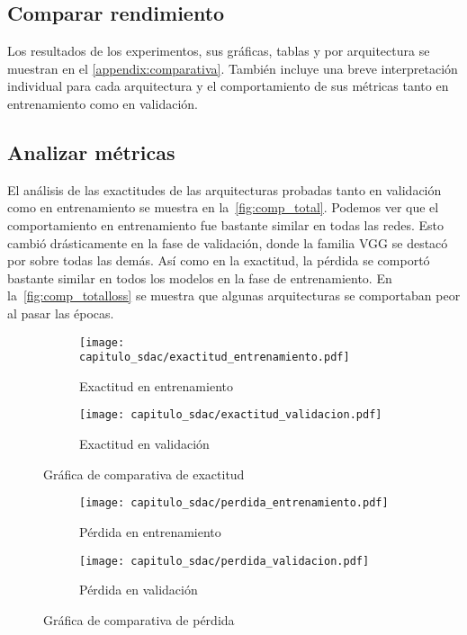 \subsection{Comparar rendimiento}

Los resultados de los experimentos, sus gráficas, tablas y por arquitectura se
muestran en el \autoref{appendix:comparativa}. También incluye una breve
interpretación individual para cada arquitectura y el comportamiento de sus
métricas tanto en entrenamiento como en validación.

\subsection{Analizar métricas}

El análisis de las exactitudes de las arquitecturas probadas tanto en validación
como en entrenamiento se muestra en la~\autoref{fig:comp_total}. Podemos ver que
el comportamiento en entrenamiento fue bastante similar en todas las redes. Esto
cambió drásticamente en la fase de validación, donde la familia VGG se destacó
por sobre todas las demás. Así como en la exactitud, la pérdida se comportó
bastante similar en todos los modelos en la fase de entrenamiento. En
la~\autoref{fig:comp_totalloss} se muestra que algunas arquitecturas se
comportaban peor al pasar las épocas.

\begin{figure}[H]
    \centering
    \begin{subfigure}[b]{0.8\textwidth}
        \centering
       \texttt{[image: capitulo\_sdac/exactitud\_entrenamiento.pdf]}
       \caption{Exactitud en entrenamiento}\label{fig:comp_ent} 
    \end{subfigure}

    \begin{subfigure}[b]{0.8\textwidth}
        \centering
       \texttt{[image: capitulo\_sdac/exactitud\_validacion.pdf]}
       \caption{Exactitud en validación}\label{fig:comp_val}
    \end{subfigure}
    \caption{Gráfica de comparativa de exactitud}\label{fig:comp_total}
\end{figure}
\begin{figure}[H]
    \centering
    \begin{subfigure}[b]{0.8\textwidth}
        \centering
       \texttt{[image: capitulo\_sdac/perdida\_entrenamiento.pdf]}
       \caption{Pérdida en entrenamiento}\label{fig:comp_entloss} 
    \end{subfigure}

    \begin{subfigure}[b]{0.8\textwidth}
        \centering
       \texttt{[image: capitulo\_sdac/perdida\_validacion.pdf]}
       \caption{Pérdida en validación}\label{fig:comp_valloss}
    \end{subfigure}
    \caption{Gráfica de comparativa de pérdida}\label{fig:comp_totalloss}
\end{figure}

